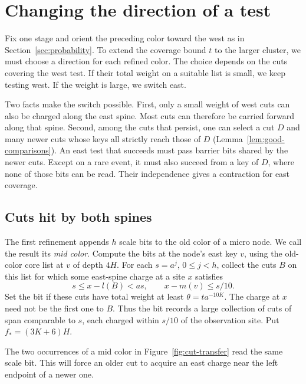 \section{Changing the direction of a test}\label{sec:switching}

Fix one stage and orient the preceding color toward the west as in
Section~\ref{sec:probability}. To extend the coverage bound \(t\) to
the larger cluster, we must choose a direction for each refined color.
The choice depends on the cuts covering the west test. If their total
weight on a suitable list is small, we keep testing west. If the
weight is large, we switch east.

Two facts make the switch possible. First, only a small weight of
west cuts can also be charged along the east spine. Most cuts can
therefore be carried forward along that spine. Second, among the cuts
that persist, one can select a cut \(D\) and many newer cuts whose keys
all strictly reach those of \(D\) (Lemma~\ref{lem:good-comparisons}).
An east test that succeeds must pass barrier bits shared by the newer
cuts. Except on a rare event, it must also succeed from a key of \(D\),
where none of those bits can be read. Their independence gives a
contraction for east coverage.

\subsection{Cuts hit by both spines}

The first refinement appends \(h\) scale bits to the old color of a
micro node. We call the result its \emph{mid color}. Compute the bits
at the node's east key \(v\), using the old-color core list at \(v\)
of depth \(4H\). For each \(s=a^j\), \(0\le j<h\), collect the cuts
\(B\) on this list for which some east-spine charge at a site \(x\)
satisfies
\begin{equation}\label{eq:scale-bit}
 s\le x-l(B)<as,\qquad x-m(v)\le s/10 .
\end{equation}
Set the bit if these cuts have total weight at least
\(\theta=t a^{-10K}\). The charge at \(x\) need not be the first one
to \(B\). Thus the bit records a large collection of cuts of span
comparable to \(s\), each charged within \(s/10\) of the observation
site. Put \(f_*=(3K+6)H\).

The two occurrences of a mid color in Figure~\ref{fig:cut-transfer}
read the same scale bit. This will force an older cut to acquire an
east charge near the left endpoint of a newer one.

